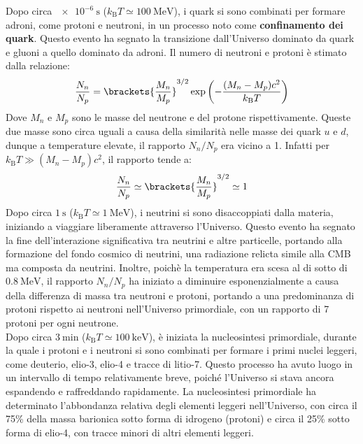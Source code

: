 Dopo circa $\qty{e-6}{\second}$ ($k_{\text{B}}T \simeq \qty{100}{\mega\electronvolt}$), i quark si sono combinati per formare adroni, come protoni e neutroni, in un processo noto come \textbf{confinamento dei quark}. Questo evento ha segnato la transizione dall'Universo dominato da quark e gluoni a quello dominato da adroni. Il numero di neutroni e protoni è stimato dalla relazione:
\begin{equation}
    \dfrac{N_n}{N_p} = \brackets{\dfrac{M_n}{M_p}}^{3/2}\exp\left(-\dfrac{(M_n - M_p) c^2}{k_{\text{B}} T}\right)
\end{equation}
Dove $M_n$ e $M_p$ sono le masse del neutrone e del protone rispettivamente. Queste due masse sono circa uguali a causa della similarità nelle masse dei quark $u$ e $d$, dunque a temperature elevate, il rapporto $N_n/N_p$ era vicino a 1. Infatti per $k_{\text{B}} T \gg (M_n - M_p)c^2$, il rapporto tende a:
\begin{equation}
    \dfrac{N_n}{N_p} \simeq \brackets{\dfrac{M_n}{M_p}}^{3/2} \simeq 1
\end{equation}
Dopo circa $\qty{1}{\second}$ ($k_{\text{B}}T \simeq \qty{1}{\mega\electronvolt}$), i neutrini si sono disaccoppiati dalla materia, iniziando a viaggiare liberamente attraverso l'Universo. Questo evento ha segnato la fine dell'interazione significativa tra neutrini e altre particelle, portando alla formazione del fondo cosmico di neutrini, una radiazione relicta simile alla CMB ma composta da neutrini. Inoltre, poichè la temperatura era scesa al di sotto di $\qty{0.8}{\mega\electronvolt}$, il rapporto $N_n/N_p$ ha iniziato a diminuire esponenzialmente a causa della differenza di massa tra neutroni e protoni, portando a una predominanza di protoni rispetto ai neutroni nell'Universo primordiale, con un rapporto di 7 protoni per ogni neutrone.\\
Dopo circa $\qty{3}{\minute}$ ($k_{\text{B}}T \simeq \qty{100}{\kilo\electronvolt}$), è iniziata la nucleosintesi primordiale, durante la quale i protoni e i neutroni si sono combinati per formare i primi nuclei leggeri, come deuterio, elio-3, elio-4 e tracce di litio-7. Questo processo ha avuto luogo in un intervallo di tempo relativamente breve, poiché l'Universo si stava ancora espandendo e raffreddando rapidamente. La nucleosintesi primordiale ha determinato l'abbondanza relativa degli elementi leggeri nell'Universo, con circa il 75\% della massa barionica sotto forma di idrogeno (protoni) e circa il 25\% sotto forma di elio-4, con tracce minori di altri elementi leggeri.\\


